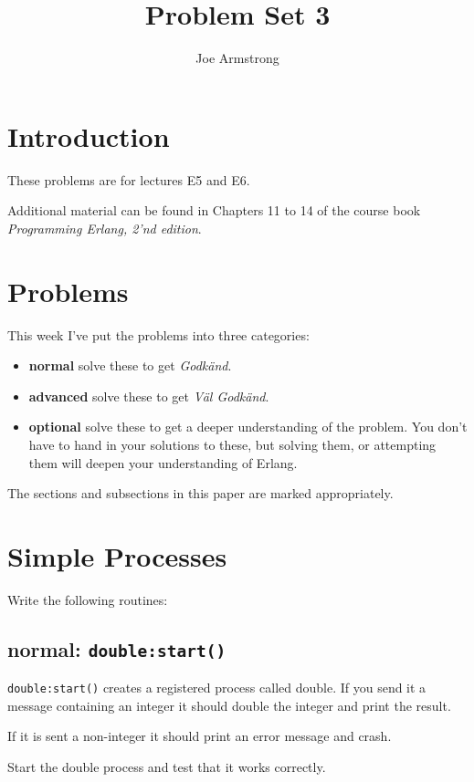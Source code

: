 \documentclass[12pt]{hitec}
\title{Problem Set 3}
\author{Joe Armstrong}
\date{}
\begin{document}
\maketitle

\tableofcontents

\section{Introduction}
These problems are for lectures E5 and E6.

Additional material can be found in Chapters 11 to 14 of the course book
{\sl Programming Erlang, 2'nd edition}.

\section{Problems}

This week I've put the problems into three categories:

\begin{itemize}
\item {\bf normal} solve these to get {\sl Godk\"{a}nd}.
\item {\bf advanced} solve these to get {\sl V\"{a}l Godk\"{a}nd}.
\item {\bf optional} solve these to get a deeper understanding of the problem. You don't
have to hand in your solutions to these, but solving them, or attempting them will
deepen your understanding of Erlang.
\end{itemize}

The sections and subsections in this paper are marked appropriately.

\section{Simple Processes}


Write the following routines:

\subsection{normal: \texttt{double:start()}}

\verb+double:start()+ creates a registered process called double.
If you send it a message containing an integer it should
double the integer and print the result.

If it is sent a non-integer it should print an error message
and crash.

Start the double process and test that it works correctly.
\end{document}
